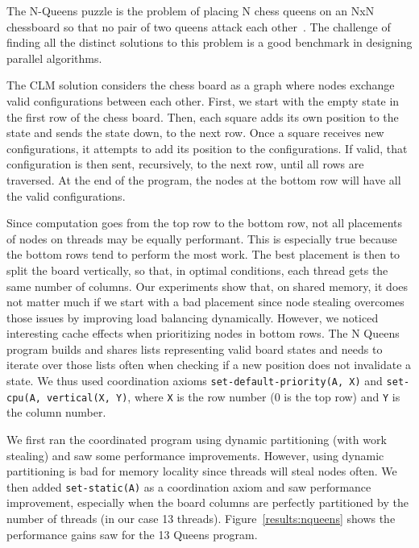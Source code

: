 The N-Queens puzzle is the problem of placing N chess queens on an NxN
chessboard so that no pair of two queens attack each
other~\cite{8queens}. The challenge of finding all the
distinct solutions to this problem is a good benchmark in designing
parallel algorithms.

The CLM solution considers the chess board as a graph where nodes exchange valid
configurations between each other. First, we start with the empty
state in the first row of the chess board. Then, each square adds its own
position to the state and sends the state down, to the next row. Once a square
receives new configurations, it attempts to add its position to the
configurations. If valid, that configuration is then sent, recursively, to the
next row, until all rows are traversed. At the end of the program, the nodes at
the bottom row will have all the valid configurations.

Since computation goes from the top row to the bottom row, not all placements of
nodes on threads may be equally performant. This is especially true because the
bottom rows tend to perform the most work. The best placement is then to split the
board vertically, so that, in optimal conditions, each thread gets the same
number of columns. Our experiments show that, on shared memory, it does not
matter much if we start with a bad placement since node stealing overcomes those
issues by improving load balancing dynamically. However, we noticed interesting
cache effects when prioritizing nodes in bottom rows. The N Queens program
builds and shares lists representing valid board states and needs to iterate
over those lists often when checking if a new position does not invalidate a state.
We thus used coordination axioms \texttt{set-default-priority(A, X)} and \texttt{set-cpu(A,
vertical(X, Y)}, where \texttt{X} is the row number (0 is the top row) and
\texttt{Y} is the column number.

We first ran the coordinated program using dynamic partitioning (with work
stealing) and saw some performance improvements. However, using dynamic
partitioning is bad for memory locality since threads will steal nodes often.
We then added \texttt{set-static(A)} as a coordination axiom and saw
performance improvement, especially when the board columns are perfectly
partitioned by the number of threads (in our case 13 threads).
Figure~\ref{results:nqueens} shows the performance gains saw for the 13 Queens
program.

\begin{topfig}
   \begin{center}
   \end{center}
\end{topfig}
